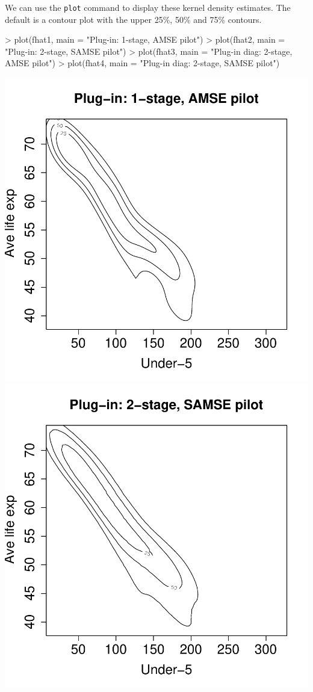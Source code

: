 \documentclass[a4paper,11pt]{article}
\begin{document}
We can use the \texttt{plot} command to display these
kernel density estimates. The default is a contour plot with 
the upper 25\%, 50\% and 75\% contours.
\begin{Schunk}
\begin{Sinput}
> plot(fhat1, main = "Plug-in: 1-stage, AMSE pilot")
> plot(fhat2, main = "Plug-in: 2-stage, SAMSE pilot")
> plot(fhat3, main = "Plug-in diag: 2-stage, AMSE pilot")
> plot(fhat4, main = "Plug-in diag: 2-stage, SAMSE pilot")
\end{Sinput}
\end{Schunk}
\begin{center}
\includegraphics{kde-006}
\includegraphics{kde-007}

\end{center}
\end{document}
